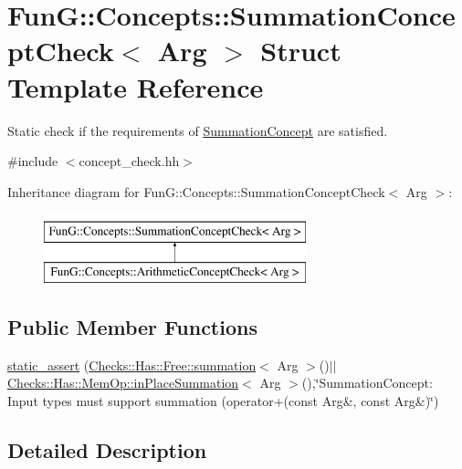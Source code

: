\hypertarget{structFunG_1_1Concepts_1_1SummationConceptCheck}{\section{\-Fun\-G\-:\-:\-Concepts\-:\-:\-Summation\-Concept\-Check$<$ \-Arg $>$ \-Struct \-Template \-Reference}
\label{structFunG_1_1Concepts_1_1SummationConceptCheck}
}


\-Static check if the requirements of \hyperlink{structFunG_1_1Concepts_1_1SummationConcept}{\-Summation\-Concept} are satisfied.  




{\ttfamily \#include $<$concept\-\_\-check.\-hh$>$}

\-Inheritance diagram for \-Fun\-G\-:\-:\-Concepts\-:\-:\-Summation\-Concept\-Check$<$ \-Arg $>$\-:\begin{figure}[H]
\begin{center}
\leavevmode
\includegraphics[height=2.000000cm]{structFunG_1_1Concepts_1_1SummationConceptCheck}
\end{center}
\end{figure}
\subsection*{\-Public \-Member \-Functions}
\begin{DoxyCompactItemize}
\item 
\hyperlink{structFunG_1_1Concepts_1_1SummationConceptCheck_a4151b258e123eec7734a316ca43b1b15}{static\-\_\-assert} (\hyperlink{namespaceFunG_1_1Checks_1_1Has_1_1Free_a1cf46f7335354d21dff506aaf812b4f5}{\-Checks\-::\-Has\-::\-Free\-::summation}$<$ \-Arg $>$()$|$$|$\hyperlink{namespaceFunG_1_1Checks_1_1Has_1_1MemOp_a23052f7d8da399943f6354a7d477c825}{\-Checks\-::\-Has\-::\-Mem\-Op\-::in\-Place\-Summation}$<$ \-Arg $>$(),\char`\"{}\-Summation\-Concept\-: \-Input types must support summation (operator+(const \-Arg\&, const \-Arg\&)\char`\"{})
\end{DoxyCompactItemize}


\subsection{\-Detailed \-Description}
